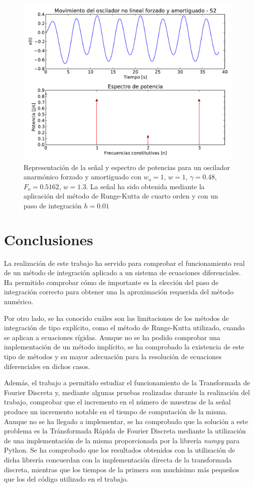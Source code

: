 \documentclass[11pt]{article}
\begin{document}
\begin{figure}
\centering
\includegraphics[width=0.75\linewidth]{caso_anarmonico_s2.pdf}
\caption{Representación de la señal y espectro de potencias para un oscilador anarmónico forzado y amortiguado con $w_o = 1$, $w = 1$, $\gamma = 0.48$, $F_o = 0.5162$, $w = 1.3$. La señal ha sido obtenida mediante la aplicación del método de Runge-Kutta de cuarto orden y con un paso de integración $h = 0.01$}
\label{fig:caso_anarmonico_s2}
\end{figure}

\section{Conclusiones}
La realización de este trabajo ha servido para comprobar el funcionamiento real de un método de integración aplicado a un sistema de ecuaciones diferenciales. Ha permitido comprobar cómo de importante es la elección del paso de integración correcto para obtener una la aproximación requerida del método numérico.

Por otro lado, se ha conocido cuáles son las limitaciones de los métodos de integración de tipo explícito, como el método de Runge-Kutta utilizado, cuando se aplican a ecuaciones rígidas. Aunque no se ha podido comprobar una implementación de un método implícito, se ha comprobado la existencia de este tipo de métodos y su mayor adecuación para la resolución de ecuaciones diferenciales en dichos casos.

Además, el trabajo a permitido estudiar el funcionamiento de la Transformada de Fourier Discreta y, mediante algunas pruebas realizadas durante la realización del trabajo, comprobar que el incremento en el número de muestras de la señal produce un incremento notable en el tiempo de computación de la misma. Aunque no se ha llegado a implementar, se ha comprobado que la solución a este problema es la Tránsformada Rápida de Fourier Discreta mediante la utilización de una implementación de la misma proporcionada por la librería \textit{numpy} para Python.
Se ha comprobado que los resultados obtenidos con la utilización de dicha librería concuerdan con la implementación directa de la transformada discreta, mientras que los tiempos de la primera son muchísimo más pequeños que los del código utilizado en el trabajo.
\end{document}
